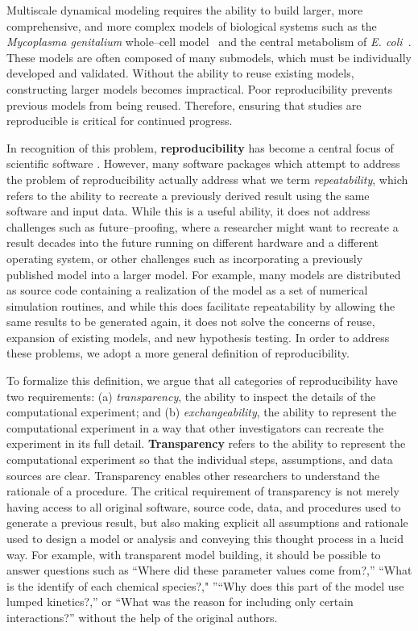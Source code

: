 \documentclass[10pt,letterpaper]{article}
\begin{document}
Multiscale dynamical modeling requires the ability to build larger, more comprehensive, and more complex models of biological systems such as the \textit{Mycoplasma genitalium} whole--cell model~\cite{karr2012whole} and the central metabolism of \textit{E. coli}~\cite{millard2017metabolic}. These models are often composed of many submodels, which must be individually developed and validated. Without the ability to reuse existing models, constructing larger models becomes impractical. Poor reproducibility prevents previous models from being reused. Therefore, ensuring that studies are reproducible is critical for continued progress.

In recognition of this problem, \textbf{reproducibility} has become a central focus of scientific software \cite{peng2011reproducible,sandve2013ten}. However, many software packages which attempt to address the problem of reproducibility actually address what we term \textit{repeatability}, which refers to the ability to recreate a previously derived result using the same software and input data. While this is a useful ability, it does not address challenges such as future--proofing, where a researcher might want to recreate a result decades into the future running on different hardware and a different operating system, or other challenges such as incorporating a previously published model into a larger model. For example, many models are distributed as source code containing a realization of the model as a set of numerical simulation routines, and while this does facilitate repeatability by allowing the same results to be generated again, it does not solve the concerns of reuse, expansion of existing models, and new hypothesis testing. In order to address these problems, we adopt a more general definition of reproducibility.

To formalize this definition, we argue that all categories of reproducibility have two requirements: (a) \textit{transparency}, the ability to inspect the details of the computational experiment; and (b) \textit{exchangeability}, the ability to represent the computational experiment in a way that other investigators can recreate the experiment in its full detail.
\textbf{Transparency} refers to the ability to represent the computational experiment so that the individual steps, assumptions, and data sources are clear. Transparency enables other researchers to understand the rationale of a procedure. The critical requirement of transparency is not merely having access to all original software, source code, data, and procedures used to generate a previous result, but also making explicit all assumptions and rationale used to design a model or analysis and conveying this thought process in a lucid way. For example, with transparent model building, it should be possible to answer questions such as ``Where did these parameter values come from?,''  ``What is the identify of each chemical species?," ''``Why does this part of the model use lumped kinetics?,'' or ``What was the reason for including only certain interactions?'' without the help of the original authors.
\end{document}
